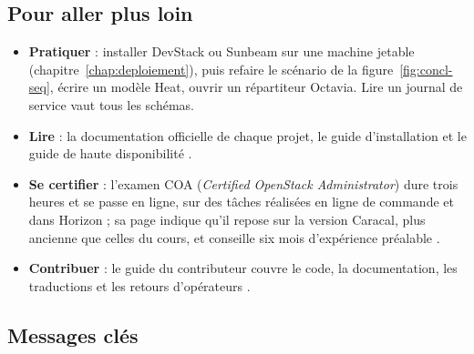 \subsection*{Pour aller plus loin}

\begin{itemize}
  \item \textbf{Pratiquer} : installer DevStack ou Sunbeam sur une machine jetable (chapitre~\ref{chap:deploiement}), puis refaire le
        scénario de la figure~\ref{fig:concl-seq}, écrire un modèle Heat, ouvrir un répartiteur Octavia. Lire un journal de service
        vaut tous les schémas.
  \item \textbf{Lire} : la documentation officielle de chaque projet, le guide d'installation et le guide de haute disponibilité
        \parencite{install-guide,ha-guide}.
  \item \textbf{Se certifier} : l'examen COA (\emph{Certified OpenStack Administrator}) dure trois heures et se passe en ligne,
        sur des tâches réalisées en ligne de commande et dans Horizon ; sa page indique qu'il repose sur la version Caracal, plus
        ancienne que celles du cours, et conseille six mois d'expérience préalable \parencite{coa}.
  \item \textbf{Contribuer} : le guide du contributeur couvre le code, la documentation, les traductions et les retours
        d'opérateurs \parencite{openstack-contributors}.
\end{itemize}

\subsection*{Messages clés}

